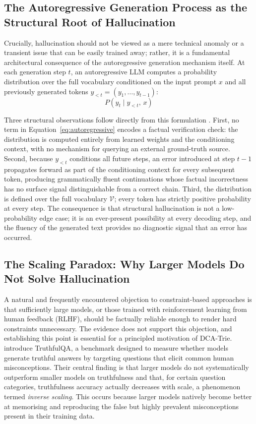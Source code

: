\subsection{The Autoregressive Generation Process as the Structural Root of Hallucination}

Crucially, hallucination should not be viewed as a mere technical anomaly or a transient issue that can be easily trained away; rather, it is a fundamental architectural consequence of the autoregressive generation mechanism itself. At each generation step $t$, an autoregressive LLM computes a probability distribution over the full vocabulary conditioned on
the input prompt $x$ and all previously generated tokens $y_{<t} = (y_1, \ldots,
    y_{t-1})$:
\begin{equation}
    P(y_t \mid y_{<t},\, x)
    \label{eq:autoregressive}
\end{equation}

Three structural observations follow directly from this formulation \citep{brown2020gpt3, huang2023survey, ji2023survey}. First, no term in Equation~\eqref{eq:autoregressive} encodes a factual verification check: the distribution is computed entirely from learned weights and the conditioning context, with no mechanism for querying an external ground-truth source. Second,
because $y_{<t}$ conditions all future steps, an error introduced at step $t-1$
propagates forward as part of the conditioning context for every subsequent
token, producing grammatically fluent continuations whose factual incorrectness
has no surface signal distinguishable from a correct chain. Third, the
distribution is defined over the full vocabulary $\mathcal{V}$; every token has
strictly positive probability at every step. The consequence is that structural
hallucination is not a low-probability edge case; it is an ever-present
possibility at every decoding step, and the fluency of the generated text
provides no diagnostic signal that an error has occurred.

\subsection{The Scaling Paradox: Why Larger Models Do Not Solve Hallucination}

A natural and frequently encountered objection to constraint-based approaches is that sufficiently large models, or those trained with reinforcement learning from human feedback (RLHF), should be factually reliable enough to render hard constraints unnecessary. The evidence does not support this objection, and establishing this point is essential for a principled motivation of DCA-Trie. \citet{lin2022truthfulqa} introduce TruthfulQA, a benchmark designed to measure whether models generate truthful answers by targeting questions that elicit common human misconceptions. Their central finding is that larger models do not systematically outperform smaller models on truthfulness and that, for certain question categories, truthfulness accuracy actually decreases with scale, a phenomenon termed \textit{inverse scaling}. This occurs because larger models natively become better at memorising and reproducing the false but highly prevalent misconceptions present in their training data.

